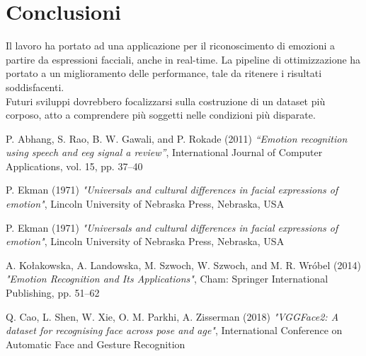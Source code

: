 \section{Conclusioni}

Il lavoro ha portato ad una applicazione per il riconoscimento di emozioni a partire da espressioni facciali, anche in real-time. La pipeline di ottimizzazione ha portato a un miglioramento delle performance, tale da ritenere i risultati soddisfacenti.\\
Futuri sviluppi dovrebbero focalizzarsi sulla costruzione di un dataset più corposo, atto a comprendere più soggetti nelle condizioni più disparate. 

\clearpage
\begin{thebibliography}{9}
P. Abhang, S. Rao, B. W. Gawali, and P. Rokade (2011) \emph{“Emotion recognition using speech and eeg signal a review”}, International  Journal  of  Computer  Applications,  vol.  15, pp. 37–40

P. Ekman (1971) \emph{"Universals and cultural differences in facial expressions of emotion"}, Lincoln University of Nebraska Press, Nebraska, USA

P. Ekman (1971) \emph{"Universals and cultural differences in facial expressions of emotion"}, Lincoln University of Nebraska Press, Nebraska, USA

A. Kołakowska, A. Landowska, M. Szwoch, W. Szwoch, and M. R. Wróbel (2014) \emph{"Emotion Recognition and Its Applications"}, Cham: Springer International Publishing, pp. 51–62

Q. Cao, L. Shen, W. Xie, O. M. Parkhi, A. Zisserman (2018) \emph{"VGGFace2: A dataset for recognising face across pose and age"}, International Conference on Automatic Face and Gesture Recognition 


\end{thebibliography}

